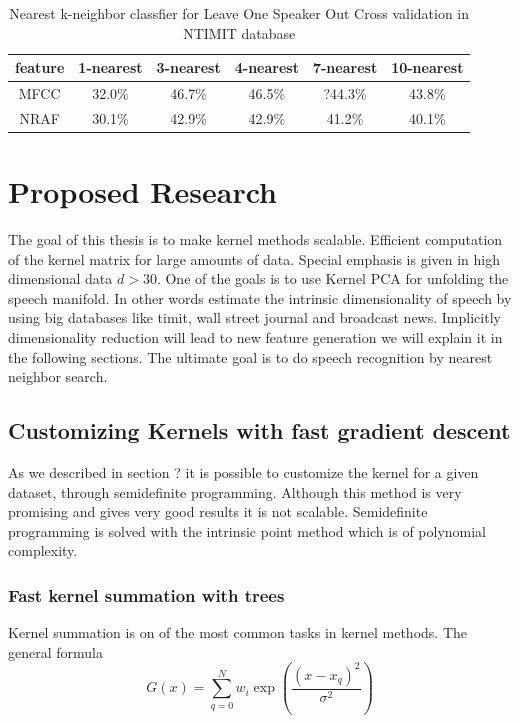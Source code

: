 \documentclass[12pt,letterpaper,doublespaced,ETD,dvips,proposal]{gtthesis}
\begin{document}
\begin{Body}
\begin{table}[htb]
\footnotesize{ \centering
\begin{tabular}{|c|c|c|c|c|c|}
  \hline
  feature & 1-nearest & 3-nearest & 4-nearest & 7-nearest & 10-nearest \\
  \hline
  MFCC & 32.0\% & 46.7\% & 46.5\% & ?44.3\% & 43.8\% \\
  NRAF & 30.1\% & 42.9\% & 42.9\% & 41.2\% & 40.1\% \\
  \hline
\end{tabular}
  \caption{Nearest k-neighbor classfier for Leave One Speaker Out
  Cross validation in  NTIMIT database}
} \label{kneighborLOOCVNTIMIT}
\end{table}


\section{Proposed Research}
\label{proposed}

The goal of this thesis is to make kernel methods scalable.
Efficient computation of the kernel matrix for large amounts of
data. Special emphasis is given in high dimensional data $d>30$. One
of the goals is to use Kernel PCA for unfolding the speech manifold.
In other words estimate the intrinsic dimensionality of speech by
using big databases like timit, wall street journal and broadcast
news. Implicitly dimensionality reduction will lead to new feature
generation we will explain it in the following sections. The
ultimate goal is to do speech recognition by nearest neighbor
search.

\subsection{Customizing Kernels with fast
gradient descent}

As we described in section ? it is possible to customize the kernel
for a given dataset, through semidefinite programming. Although this
method is very promising and gives very good results it is not
scalable. Semidefinite programming is solved with the intrinsic
point method which is of polynomial complexity.

\subsubsection{Fast kernel summation with trees}
Kernel summation is on of the most common tasks in kernel methods.
The general formula
\begin{equation}
\label{kernel_sum}
  G(x)=\sum_{q=0}^{N} w_i\exp(\frac{(x-x_q)^2}{\sigma^2})
\end{equation}


\end{Body}
\end{document}
